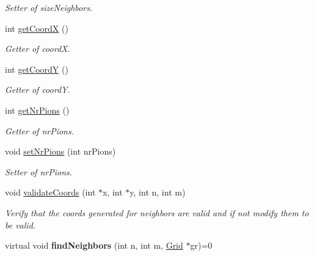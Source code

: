 \begin{DoxyCompactItemize}
\begin{DoxyCompactList}\small\item\em Setter of size\+Neighbors. \end{DoxyCompactList}\item 
int \hyperlink{classCell_a23b2ffae45833185853314632f4445b7}{get\+Coord\+X} ()
\begin{DoxyCompactList}\small\item\em Getter of coord\+X. \end{DoxyCompactList}\item 
int \hyperlink{classCell_a2183e6b253f534961eeb3db0e21261d2}{get\+Coord\+Y} ()
\begin{DoxyCompactList}\small\item\em Getter of coord\+Y. \end{DoxyCompactList}\item 
int \hyperlink{classCell_a490db23d1a51b67720a9d90d7126b26d}{get\+Nr\+Pions} ()
\begin{DoxyCompactList}\small\item\em Getter of nr\+Pions. \end{DoxyCompactList}\item 
\hypertarget{classCell_a68bda7accaf49ff5009c1e38305d85a2}{void \hyperlink{classCell_a68bda7accaf49ff5009c1e38305d85a2}{set\+Nr\+Pions} (int nr\+Pions)}\label{classCell_a68bda7accaf49ff5009c1e38305d85a2}

\begin{DoxyCompactList}\small\item\em Setter of nr\+Pions. \end{DoxyCompactList}\item 
void \hyperlink{classCell_aec89579133ca6fa8c7ca26264794e9ae}{validate\+Coords} (int $\ast$x, int $\ast$y, int n, int m)
\begin{DoxyCompactList}\small\item\em Verify that the coords generated for neighbors are valid and if not modify them to be valid. \end{DoxyCompactList}\item 
\hypertarget{classCell_a2cdebda60e360411094517842f62b712}{virtual void {\bfseries find\+Neighbors} (int n, int m, \hyperlink{classGrid}{Grid} $\ast$gr)=0}\label{classCell_a2cdebda60e360411094517842f62b712}

\end{DoxyCompactItemize}


